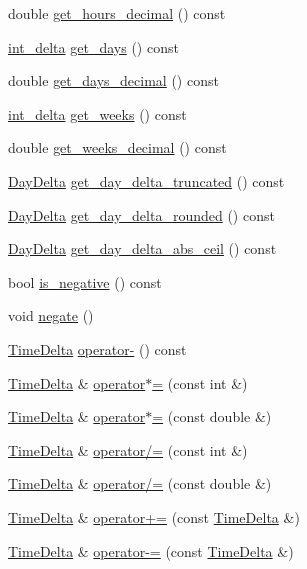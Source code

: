\begin{DoxyCompactItemize}
\item 
double \hyperlink{structTimeDelta_af64fa27b7580167e18cd30ab1bec06ac}{get\-\_\-hours\-\_\-decimal} () const 
\item 
\hyperlink{types_8h_a10729255b1946fd4fb654b2fe814910b}{int\-\_\-delta} \hyperlink{structTimeDelta_a0ce6b1715ab92fa1e66e14e952a64268}{get\-\_\-days} () const 
\item 
double \hyperlink{structTimeDelta_a76f968368aff4b45c80b0b147c417fd3}{get\-\_\-days\-\_\-decimal} () const 
\item 
\hyperlink{types_8h_a10729255b1946fd4fb654b2fe814910b}{int\-\_\-delta} \hyperlink{structTimeDelta_aab4f773272785b9421b101ee243c0eaf}{get\-\_\-weeks} () const 
\item 
double \hyperlink{structTimeDelta_a927aad8d85f646d3712ded9c09ae957a}{get\-\_\-weeks\-\_\-decimal} () const 
\item 
\hyperlink{structDayDelta}{\-Day\-Delta} \hyperlink{structTimeDelta_a159836075fddd7cef439a08b206f0e97}{get\-\_\-day\-\_\-delta\-\_\-truncated} () const 
\item 
\hyperlink{structDayDelta}{\-Day\-Delta} \hyperlink{structTimeDelta_a188dd345b8e7eeceff4320103c727d15}{get\-\_\-day\-\_\-delta\-\_\-rounded} () const 
\item 
\hyperlink{structDayDelta}{\-Day\-Delta} \hyperlink{structTimeDelta_a50d3fe29ff74cd653c6b063c0ba05528}{get\-\_\-day\-\_\-delta\-\_\-abs\-\_\-ceil} () const 
\item 
bool \hyperlink{structTimeDelta_acc2faf0e9a1563c84fb68cad42521c54}{is\-\_\-negative} () const 
\item 
void \hyperlink{structTimeDelta_a858c8d0eae6070a24ba7fd3e18a3cf3f}{negate} ()
\item 
\hyperlink{structTimeDelta}{\-Time\-Delta} \hyperlink{structTimeDelta_a660df6f5ba7291bef24d5a05639563b6}{operator-\/} () const 
\item 
\hyperlink{structTimeDelta}{\-Time\-Delta} \& \hyperlink{structTimeDelta_ae317349e9984990e3d2ff2489036055b}{operator$\ast$=} (const int \&)
\item 
\hyperlink{structTimeDelta}{\-Time\-Delta} \& \hyperlink{structTimeDelta_a9d7e96eccef60bf752488a94b6b54939}{operator$\ast$=} (const double \&)
\item 
\hyperlink{structTimeDelta}{\-Time\-Delta} \& \hyperlink{structTimeDelta_a099195e2bc83ea7f217a566732c8037d}{operator/=} (const int \&)
\item 
\hyperlink{structTimeDelta}{\-Time\-Delta} \& \hyperlink{structTimeDelta_aaf7f4de78973da02b04891bab2f49ca3}{operator/=} (const double \&)
\item 
\hyperlink{structTimeDelta}{\-Time\-Delta} \& \hyperlink{structTimeDelta_a71cc0f1b1f3bf080e34a73902b1a1a81}{operator+=} (const \hyperlink{structTimeDelta}{\-Time\-Delta} \&)
\item 
\hyperlink{structTimeDelta}{\-Time\-Delta} \& \hyperlink{structTimeDelta_aca3281505a032868194e2e9a890b2e49}{operator-\/=} (const \hyperlink{structTimeDelta}{\-Time\-Delta} \&)
\end{DoxyCompactItemize}
